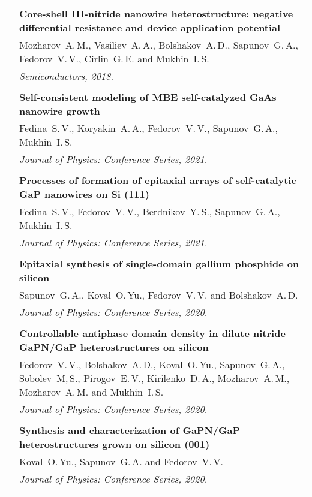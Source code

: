 \documentclass[letterpaper, 11pt]{article}
\begin{document}
\begin{longtable}{p{1.3in}p{4.8in}}
		& \textbf{Core-shell III-nitride nanowire heterostructure: negative differential resistance and device application potential} \\
		& Mozharov~A.\,M., Vasiliev~A.\,A., Bolshakov~A.\,D., Sapunov~G.\,A., Fedorov~V.\,V., Cirlin~G.\,E. and Mukhin~I.\,S. \\
		& \textit{Semiconductors, 2018.}\\
		& \\

		\nohyphens{\color{OliveGreen}{Q4 Publications}}
        & \textbf{Self-consistent modeling of MBE self-catalyzed GaAs nanowire
        growth} \\
        & Fedina~S.\,V., Koryakin~A.\,A., Fedorov~V.\,V., Sapunov~G.\,A.,
        Mukhin~I.\,S. \\
		& \textit{Journal of Physics: Conference Series, 2021.}\\
		& \\

        & \textbf{Processes of formation of epitaxial arrays of self-catalytic
        GaP nanowires on Si (111)} \\
        & Fedina~S.\,V., Fedorov~V.\,V., Berdnikov~Y.\,S., Sapunov~G.\,A.,
        Mukhin~I.\,S. \\
		& \textit{Journal of Physics: Conference Series, 2021.}\\
		& \\
		
        & \textbf{Epitaxial synthesis of single-domain gallium phosphide on
        silicon} \\
        & Sapunov~G.\,A., Koval~O.\,Yu., Fedorov~V.\,V. and Bolshakov~A.\,D. \\
		& \textit{Journal of Physics: Conference Series, 2020.}\\
		& \\
		
        & \textbf{Controllable antiphase domain density in dilute nitride
        GaPN/GaP heterostructures on silicon} \\
        & Fedorov~V.\,V., Bolshakov~A.\,D., Koval~O.\,Yu., Sapunov~G.\,A.,
        Sobolev~M,\,S., Pirogov~E.\,V., Kirilenko~D.\,A., Mozharov~A.\,M.,
        Mozharov~A.\,M. and Mukhin~I.\,S. \\
		& \textit{Journal of Physics: Conference Series, 2020.}\\
		& \\
		
        & \textbf{Synthesis and characterization of GaPN/GaP heterostructures
        grown on silicon (001)} \\
        & Koval~O.\,Yu., Sapunov~G.\,A. and Fedorov~V.\,V. \\
		& \textit{Journal of Physics: Conference Series, 2020.}\\
		& \\
		

\end{longtable}
\end{document}
